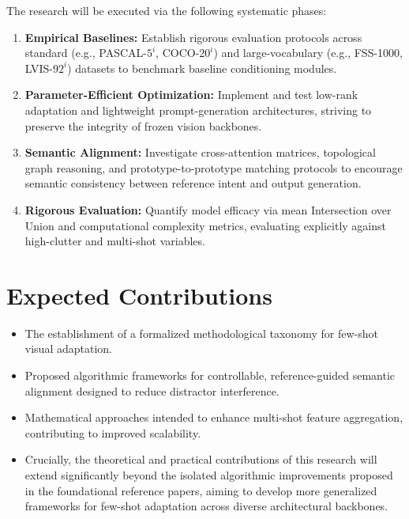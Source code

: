 \documentclass[journal,12pt,onecolumn,draftclsnofoot]{IEEEtran}
\begin{document}
The research will be executed via the following systematic phases:

\begin{enumerate}[label=\arabic*., noitemsep, topsep=0pt]
    \item \textbf{Empirical Baselines:} Establish rigorous evaluation protocols across standard (e.g., PASCAL-$5^i$, COCO-$20^i$) and large-vocabulary (e.g., FSS-1000, LVIS-$92^i$) datasets to benchmark baseline conditioning modules.

    \item \textbf{Parameter-Efficient Optimization:} Implement and test low-rank adaptation and lightweight prompt-generation architectures, striving to preserve the integrity of frozen vision backbones.

    \item \textbf{Semantic Alignment:} Investigate cross-attention matrices, topological graph reasoning, and prototype-to-prototype matching protocols to encourage semantic consistency between reference intent and output generation.

    \item \textbf{Rigorous Evaluation:} Quantify model efficacy via mean Intersection over Union and computational complexity metrics, evaluating explicitly against high-clutter and multi-shot variables.
\end{enumerate}

\section{Expected Contributions}

\begin{itemize}[noitemsep, topsep=0pt]
    \item The establishment of a formalized methodological taxonomy for few-shot visual adaptation.

    \item Proposed algorithmic frameworks for controllable, reference-guided semantic alignment designed to reduce distractor interference.

    \item Mathematical approaches intended to enhance multi-shot feature aggregation, contributing to improved scalability.

    \item Crucially, the theoretical and practical contributions of this research will extend significantly beyond the isolated algorithmic improvements proposed in the foundational reference papers, aiming to develop more generalized frameworks for few-shot adaptation across diverse architectural backbones.
\end{itemize}
\end{document}
